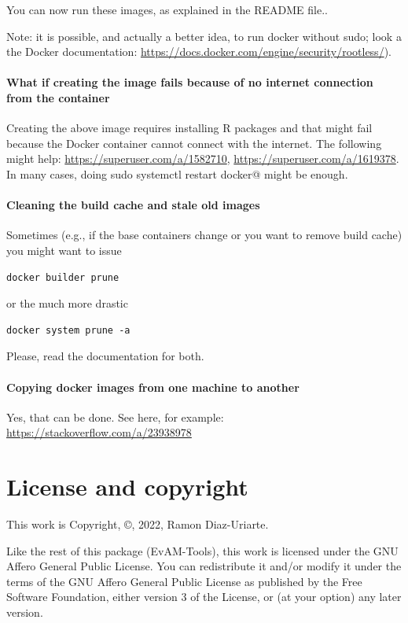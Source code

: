 \documentclass[a4paper,11pt]{article}
\begin{document}
You can now run these images, as explained in the README file..

Note: it is possible, and actually a better idea, to run docker without sudo; look a the Docker documentation:
\url{https://docs.docker.com/engine/security/rootless/}).


\paragraph{What if creating the image fails because of no internet connection from the container}
Creating the above image requires installing R packages and that might fail because the Docker container cannot connect with the internet. The following might help: \url{https://superuser.com/a/1582710}, \url{https://superuser.com/a/1619378}. In many cases, doing
\verb@ sudo systemctl restart docker@ might be enough.


\paragraph{Cleaning the build cache and stale old images}
Sometimes (e.g., if the base containers change or you want to remove build cache) you might want to issue

\begin{verbatim}
docker builder prune
\end{verbatim}

or the much more drastic

\begin{verbatim}
docker system prune -a

\end{verbatim}
Please, read the documentation for both.


\paragraph{Copying docker images from one machine to another}
Yes, that can be done. See here, for example: \url{https://stackoverflow.com/a/23938978}


\section{License and copyright}
This work is Copyright, \copyright, 2022, Ramon Diaz-Uriarte.

Like the rest of this package (EvAM-Tools), this work is licensed under the GNU Affero General Public License. You can redistribute it and/or modify it under the terms of the GNU Affero General Public License as published by the Free Software Foundation, either version 3 of the License, or (at your option) any later version.
\end{document}
